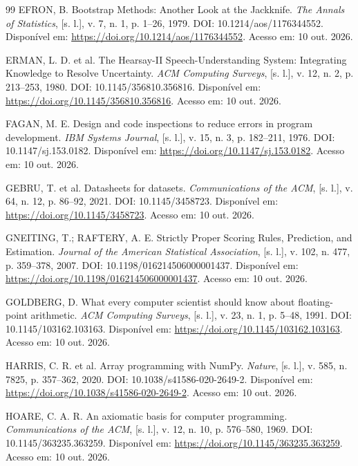 \begin{thebibliography}{99}
 EFRON, B. Bootstrap Methods: Another Look at the Jackknife. \textit{The Annals of Statistics}, [s. l.], v. 7, n. 1, p. 1--26, 1979. DOI: 10.1214/aos/1176344552. Disponível em: \url{https://doi.org/10.1214/aos/1176344552}. Acesso em: 10 out. 2026.

 ERMAN, L. D. et al. The Hearsay-II Speech-Understanding System: Integrating Knowledge to Resolve Uncertainty. \textit{ACM Computing Surveys}, [s. l.], v. 12, n. 2, p. 213--253, 1980. DOI: 10.1145/356810.356816. Disponível em: \url{https://doi.org/10.1145/356810.356816}. Acesso em: 10 out. 2026.

 FAGAN, M. E. Design and code inspections to reduce errors in program development. \textit{IBM Systems Journal}, [s. l.], v. 15, n. 3, p. 182--211, 1976. DOI: 10.1147/sj.153.0182. Disponível em: \url{https://doi.org/10.1147/sj.153.0182}. Acesso em: 10 out. 2026.

 GEBRU, T. et al. Datasheets for datasets. \textit{Communications of the ACM}, [s. l.], v. 64, n. 12, p. 86--92, 2021. DOI: 10.1145/3458723. Disponível em: \url{https://doi.org/10.1145/3458723}. Acesso em: 10 out. 2026.

 GNEITING, T.; RAFTERY, A. E. Strictly Proper Scoring Rules, Prediction, and Estimation. \textit{Journal of the American Statistical Association}, [s. l.], v. 102, n. 477, p. 359--378, 2007. DOI: 10.1198/016214506000001437. Disponível em: \url{https://doi.org/10.1198/016214506000001437}. Acesso em: 10 out. 2026.

 GOLDBERG, D. What every computer scientist should know about floating-point arithmetic. \textit{ACM Computing Surveys}, [s. l.], v. 23, n. 1, p. 5--48, 1991. DOI: 10.1145/103162.103163. Disponível em: \url{https://doi.org/10.1145/103162.103163}. Acesso em: 10 out. 2026.

 HARRIS, C. R. et al. Array programming with NumPy. \textit{Nature}, [s. l.], v. 585, n. 7825, p. 357--362, 2020. DOI: 10.1038/s41586-020-2649-2. Disponível em: \url{https://doi.org/10.1038/s41586-020-2649-2}. Acesso em: 10 out. 2026.

 HOARE, C. A. R. An axiomatic basis for computer programming. \textit{Communications of the ACM}, [s. l.], v. 12, n. 10, p. 576--580, 1969. DOI: 10.1145/363235.363259. Disponível em: \url{https://doi.org/10.1145/363235.363259}. Acesso em: 10 out. 2026.


\end{thebibliography}

